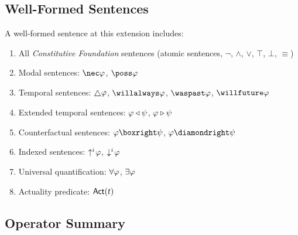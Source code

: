 \documentclass[../LogosReference.tex]{subfiles}
\begin{document}
\subsection{Well-Formed Sentences}\label{sec:well-formed-sentences}

A well-formed sentence at this extension includes:
\begin{enumerate}
	\item All \textit{Constitutive Foundation} sentences (atomic sentences, $\neg$, $\land$, $\lor$, $\top$, $\bot$, $\equiv$)
	\item Modal sentences: $\nec\metaA$, $\poss\metaA$
	\item Temporal sentences: $\always\metaA$, $\willalways\metaA$, $\waspast\metaA$, $\willfuture\metaA$
	\item Extended temporal sentences: $\varphi \triangleleft \psi$, $\varphi \triangleright \psi$
	\item Counterfactual sentences: $\metaA \boxright \metaB$, $\metaA \diamondright \metaB$
	\item Indexed sentences: $\uparrow^{i}\hspace{-2pt}\varphi$, $\downarrow^{i}\hspace{-2pt}\varphi$
	\item Universal quantification: $\forall\varphi$, $\exists\varphi$
	\item Actuality predicate: $\mathsf{Act}(t)$
\end{enumerate}


\subsection{Operator Summary}\label{sec:operator-summary}
\end{document}
